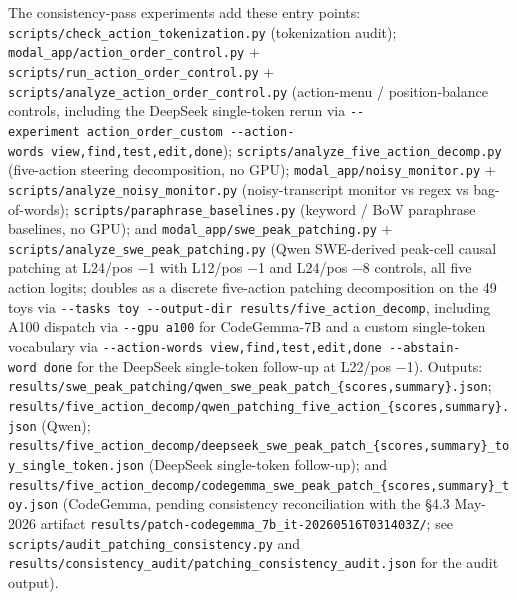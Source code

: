 \documentclass[
  11pt,
  a4paper]{article}
\begin{document}
The consistency-pass experiments add these entry points:
\texttt{scripts/check\_action\_tokenization.py} (tokenization audit);
\texttt{modal\_app/action\_order\_control.py} +
\texttt{scripts/run\_action\_order\_control.py} +
\texttt{scripts/analyze\_action\_order\_control.py} (action-menu /
position-balance controls, including the DeepSeek single-token rerun via
\texttt{-\/-experiment\ action\_order\_custom\ -\/-action-words\ view,find,test,edit,done});
\texttt{scripts/analyze\_five\_action\_decomp.py} (five-action steering
decomposition, no GPU); \texttt{modal\_app/noisy\_monitor.py} +
\texttt{scripts/analyze\_noisy\_monitor.py} (noisy-transcript monitor vs
regex vs bag-of-words); \texttt{scripts/paraphrase\_baselines.py}
(keyword / BoW paraphrase baselines, no GPU); and
\texttt{modal\_app/swe\_peak\_patching.py} +
\texttt{scripts/analyze\_swe\_peak\_patching.py} (Qwen SWE-derived
peak-cell causal patching at L24/pos \ensuremath{-}1 with L12/pos \ensuremath{-}1 and L24/pos \ensuremath{-}8
controls, all five action logits; doubles as a discrete five-action
patching decomposition on the 49 toys via
\texttt{-\/-tasks\ toy\ -\/-output-dir\ results/five\_action\_decomp},
including A100 dispatch via \texttt{-\/-gpu\ a100} for CodeGemma-7B and
a custom single-token vocabulary via
\texttt{-\/-action-words\ view,find,test,edit,done\ -\/-abstain-word\ done}
for the DeepSeek single-token follow-up at L22/pos \ensuremath{-}1). Outputs:
\texttt{results/swe\_peak\_patching/qwen\_swe\_peak\_patch\_\{scores,summary\}.json};
\texttt{results/five\_action\_decomp/qwen\_patching\_five\_action\_\{scores,summary\}.json}
(Qwen);
\texttt{results/five\_action\_decomp/deepseek\_swe\_peak\_patch\_\{scores,summary\}\_toy\_single\_token.json}
(DeepSeek single-token follow-up); and
\texttt{results/five\_action\_decomp/codegemma\_swe\_peak\_patch\_\{scores,summary\}\_toy.json}
(CodeGemma, pending consistency reconciliation with the \S{}4.3 May-2026
artifact \texttt{results/patch-codegemma\_7b\_it-20260516T031403Z/}; see
\texttt{scripts/audit\_patching\_consistency.py} and
\texttt{results/consistency\_audit/patching\_consistency\_audit.json}
for the audit output).
\end{document}
